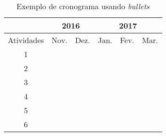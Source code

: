 \documentclass[a4paper,12pt]{monografia}
\theoremstyle{plain}
\theoremstyle{definition}
\theoremstyle{remark}
\begin{document}
\newcommand{\X}{\textbullet}

 \begin{table}[ht]
 \centering
 \begin{tabular}{|c|c|c|c|c|c|}

  \hline
 &\multicolumn{2}{|c|}{\textbf{2016}}&\multicolumn{3}{|c|}{\textbf{2017}} \\
 \hline
 \hline
 Atividades & Nov. & Dez. & Jan. & Fev. & Mar. \\
 \hline
 1    &  \X  &  \X    &     &       &        \\ 
 2    &      &  \X    &     &       &        \\ 
 3    &      &  \X    &  \X &       &        \\ 
 4    &      &  \X    &  \X &  \X   &        \\
 5    &      &        &  \X &  \X   &        \\ 
 6    &      &        &     &       &  \X    \\ 
 \hline
 \hline 

 \end{tabular}
 \caption{Exemplo de cronograma usando \textit{bullets}}
 \label{tab:bullets}
 \end{table}




\singlespacing



\end{document}
